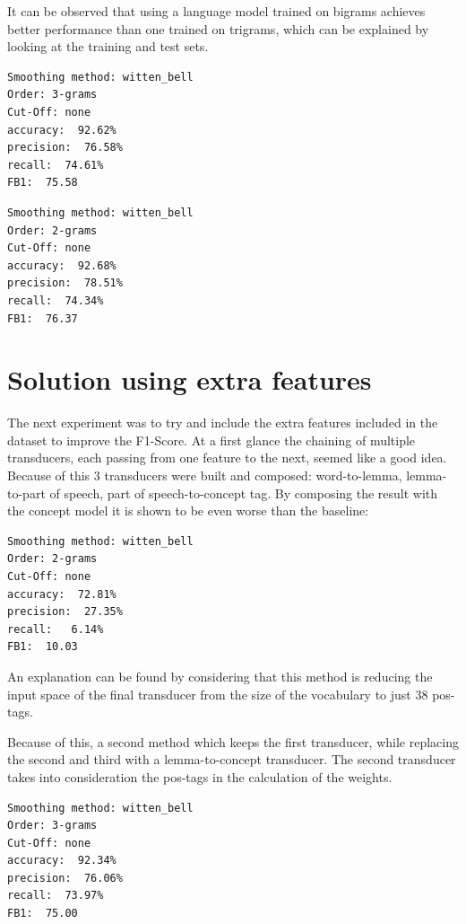 \documentclass[11pt,a4paper]{article}
\begin{document}
It can be observed that using a language model trained on bigrams achieves better performance than one trained on trigrams, which can be explained by looking at the training and test sets.

\begin{verbatim}
Smoothing method: witten_bell
Order: 3-grams
Cut-Off: none
accuracy:  92.62%
precision:  76.58%
recall:  74.61%
FB1:  75.58
\end{verbatim}

\begin{verbatim}
Smoothing method: witten_bell
Order: 2-grams
Cut-Off: none
accuracy:  92.68%
precision:  78.51%
recall:  74.34%
FB1:  76.37
\end{verbatim}

\section{Solution using extra features}

The next experiment was to try and include the extra features included in the dataset to improve the F1-Score.
At a first glance the chaining of multiple transducers, each passing from one feature to the next, seemed like a good idea.
Because of this 3 transducers were built and composed: word-to-lemma, lemma-to-part of speech, part of speech-to-concept tag.
By composing the result with the concept model it is shown to be even worse than the baseline:

\begin{verbatim}
Smoothing method: witten_bell
Order: 2-grams
Cut-Off: none
accuracy:  72.81%
precision:  27.35%
recall:   6.14%
FB1:  10.03
\end{verbatim}

An explanation can be found by considering that this method is reducing the input space of the final transducer from the size of the vocabulary to just 38 pos-tags.

Because of this, a second method which keeps the first transducer, while replacing the second and third with a lemma-to-concept transducer.
The second transducer takes into consideration the pos-tags in the calculation of the weights.

\begin{verbatim}
Smoothing method: witten_bell
Order: 3-grams
Cut-Off: none
accuracy:  92.34%
precision:  76.06%
recall:  73.97%
FB1:  75.00
\end{verbatim}
\end{document}
